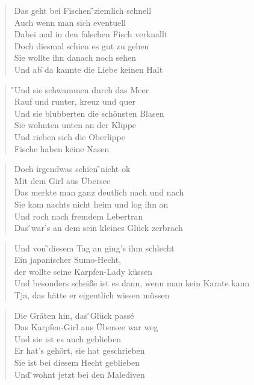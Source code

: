 \documentclass[9pt,a4paper,oneside, onecolumn]{article}
\begin{document}
\begin{multicols}{2}
\begin{verse}
Das \D{}geht bei Fischen \G{}ziemlich schnell\\
Auch \C{}wenn man sich eventuell\\
Dabei mal in den falschen Fisch verknallt\\
Doch diesmal schien es gut zu gehen\\
Sie wollte ihn danach noch sehen\\
Und ab \G{}da kannte die \Em{}Liebe keinen \C{}Halt\\
\end{verse}

\begin{verse}
\G{}Und sie schwammen \Em{}durch das Meer\\
\C{}Rauf und runter, kreuz und quer\\
Und sie blubberten die schönsten Blasen\\
Sie wohnten unten an der Klippe\\
Und rieben sich die Oberlippe\\
Fische haben keine Nasen\\
\end{verse}

\begin{verse}
Doch \D{}irgendwas schien \G{}nicht ok\\
\C{}Mit dem Girl aus Übersee\\
Das merkte man ganz deutlich nach und nach\\
Sie kam nachts nicht heim und log ihn an\\
Und roch nach fremdem Lebertran\\
Das \G{}war's an dem sein \Em{}kleines Glück \C{}zerbrach\\
\end{verse}

\begin{verse}
Und von \G{}diesem Tag an \Em{}ging's ihm schlecht\\
Ein \C{}japanischer Sumo-Hecht,\\
der wollte seine Karpfen-Lady küssen\\
Und besonders scheiße ist es dann, wenn man kein Karate kann\\
Tja, das hätte er eigentlich wissen müssen\\
\end{verse}

\begin{verse}
Die \D{}Gräten hin, das \G{}Glück passé\\
Das \C{}Karpfen-Girl aus Übersee war weg\\
Und sie ist es auch geblieben\\
Er hat's gehört, sie hat geschrieben\\
Sie ist bei diesem Hecht geblieben\\
Und \G{}wohnt jetzt \Em{}bei den \C{}Malediven\\
\end{verse}


\end{multicols}
\end{document}
